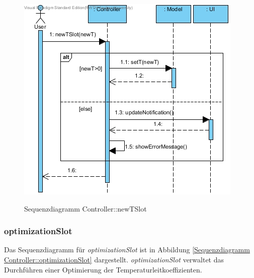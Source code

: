 \begin{figure}[H]
	\centering
	\includegraphics[scale=.7]{Bilder/Controller__newTSlot().jpg}\\
	\caption{Sequenzdiagramm Controller::newTSlot}
	\label{Sequenzdiagramm Controller::newTSlot}
\end{figure}

\subsubsection*{optimizationSlot}

Das Sequenzdiagramm für \emph{optimizationSlot} ist in Abbildung \ref{Sequenzdiagramm Controller::optimizationSlot} dargestellt. \emph{optimizationSlot} verwaltet das Durchführen einer Optimierung der Temperaturleitkoeffizienten.

